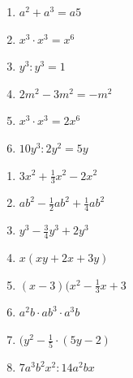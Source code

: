 \begin{enumerate}[label=\thesubsection.\arabic*]


\begin{multicols}{2}

\begin{enumerate}[label=\alph*)]

\item $a^2  + a^3  = a5$

\item $x^3  \cdot  x^3 = x^6$

\item $y^3 : y^3 = 1$

\item $2m^2 - 3m^2 = -m^2$

\item $x^3 \cdot x^3 = 2x^6$

\item $10y^3 : 2y^2 = 5y$

\end{enumerate}

\end{multicols}


\begin{multicols}{2}

\begin{enumerate}[label=\alph*)]
    \item $3x^2 + \frac{1}{3}x^2 - 2x^2$
    
    \item $ab^2 - \frac{1}{2}ab^2 + \frac{1}{4}ab^2$
    
    \item $y^3 - \frac{3}{4}y^3 + 2y^3$
    
    \item $x(xy+2x+3y)$
    
    \item $(x-3)(x^2-\frac{1}{3}x+3$
    
    \item $a^2b \cdot ab^3 \cdot a^3b$
    
    \item $(y^2-\frac{1}{5} \cdot (5y-2)$
    
    \item $7a^3b^2x^2 : 14a^2bx$
    

\end{enumerate}
\end{multicols}
\end{enumerate}
